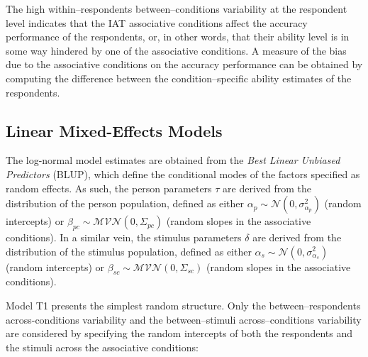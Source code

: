 \documentclass[12pt]{book}
\begin{document}
The high within--respondents between--conditions variability at the respondent level indicates that the IAT associative conditions affect the accuracy performance of the respondents, or, in other words, that their ability level is in some way hindered by one of the associative conditions.
A measure of the bias due to the associative conditions on the accuracy performance can be obtained by computing the difference between the condition--specific ability estimates of  the respondents. 


\subsection[Linear Mixed-Effects Models]{Linear Mixed-Effects Models}\label{sub:logtimemodels}
The log-normal model estimates are obtained from the \emph{Best Linear Unbiased Predictors} (BLUP), which define the conditional modes of the factors specified as random effects. 
	As such, the person parameters $\tau$ are derived from the distribution of the person population, defined as either $\alpha_p \sim \mathcal{N}(0, \sigma_{\alpha_p}^2)$ (random intercepts) or $\beta_{pc} \sim \mathcal{MVN}(0, \Sigma_{pc})$ (random slopes in the associative conditions). 
	In a similar vein, the stimulus parameters $\delta$ are derived from the  distribution of the stimulus population, defined as either $\alpha_s \sim \mathcal{N}(0, \sigma_{\alpha_s}^2)$ (random intercepts) or $\beta_{sc} \sim \mathcal{MVN}(0, \Sigma_{sc})$ (random slopes in the associative conditions). 

Model T1 presents the simplest random structure. Only the between--respondents across-conditions variability and the between--stimuli across--conditions variability are considered by specifying the random intercepts of both the respondents and the stimuli across the associative conditions: 
\end{document}
